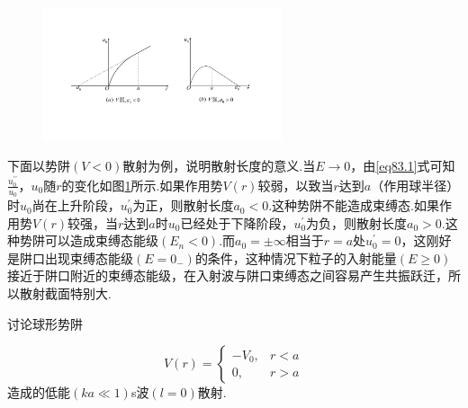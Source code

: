 \begin{figure}[!h]
	\centering
	\small
	\includegraphics[width=7cm,clip]{QM file/figure/8-4}
	\caption{}\label{fig.8-4}
\end{figure}

下面以势阱$(V<0)$散射为例，说明散射长度的意义.当$E\rightarrow0$，由\eqref{eq83.1}式可知$\frac{u_{0}^{\prime\prime}}{u_{0}}$，$u_{0}$随$r$的变化如图\ref{fig.8-4}所示.如果作用势$V(r)$较弱，以致当$r$达到$a$（作用球半径）时$u_{0}$尚在上升阶段，$u_{0}^{\prime}$为正，则散射长度$a_{0}<0$.这种势阱不能造成束缚态.如果作用势$V(r)$较强，当$r$达到$a$时$u_{0}$已经处于下降阶段，$u_{0}^{\prime}$为负，则散射长度$a_{0}>0$.这种势阱可以造成束缚态能级$(E_{n}<0)$.而$a_{0}=\pm\infty$相当于$r=a$处$u_{0}^{\prime}=0$，这刚好是阱口出现束缚态能级$(E=0_{-})$的条件，这种情况下粒子的入射能量$(E\geqslant0)$接近于阱口附近的束缚态能级，在入射波与阱口束缚态之间容易产生共振跃迁，所以散射截面特别大.
\pskip

\example 讨论球形势阱

\begin{equation}\label{eq83.12}
	V(r)=
	\begin{cases}
		-V_{0},	& r<a	\\
		0,	& r>a
	\end{cases}
\end{equation}
造成的低能$(ka\ll1)$s波$(l=0)$散射.

